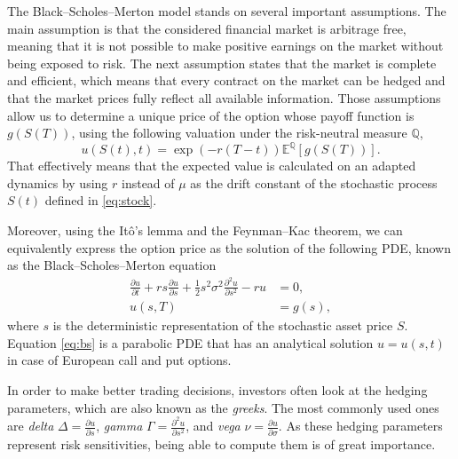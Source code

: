 \documentclass{UUThesisTemplate}
\begin{document}
\par
The Black--Scholes--Merton model stands on several important assumptions. The main assumption is that the considered financial market is arbitrage free, meaning that it is not possible to make positive earnings on the market without being exposed to risk. The next assumption states that the market is complete and efficient, which means that every contract on the market can be hedged and that the market prices fully reflect all available information. Those assumptions allow us to determine a unique price of the option whose payoff function is $g(S(T))$, using the following valuation under the risk-neutral measure $\mathbb{Q}$,
\begin{equation}
\label{eq:mc}
u(S(t), t)=\exp\left(-r(T-t)\right)\mathbb{E}^{\mathbb{Q}}\left[g(S(T))\right].
\end{equation}
That effectively means that the expected value is calculated on an adapted dynamics by using $r$ instead of $\mu$ as the drift constant of the stochastic process $S(t)$ defined in \eqref{eq:stock}. 

\par
Moreover, using the It\^o's lemma and the Feynman--Kac theorem, we can equivalently express the option price as the solution of the following PDE, known as the Black--Scholes--Merton equation
\begin{align}
\frac{\partial u}{\partial t} + r s \frac{\partial u} {\partial s} + \frac{1}{2} s^2 \sigma^2 \frac{\partial^2 u}{\partial s^2} - r u &= 0, \nonumber \\
u(s,T) &= g(s), \label{eq:bs}
\end{align}
where $s$ is the deterministic representation of the stochastic asset price $S$. Equation \eqref{eq:bs} is a parabolic PDE that has an analytical solution $u=u(s,t)$ in case of European call and put options. %

\par
In order to make better trading decisions, investors often look at the hedging parameters, which are also known as the \emph{greeks}. The most commonly used ones are \emph{delta} $\Delta = \frac{\partial u}{\partial s}$, \emph{gamma} $\Gamma = \frac{\partial^2 u}{\partial s^2}$, and \emph{vega} $\nu = \frac{\partial u}{\partial \sigma}$. As these hedging parameters represent risk sensitivities, being able to compute them is of great importance.
\end{document}
